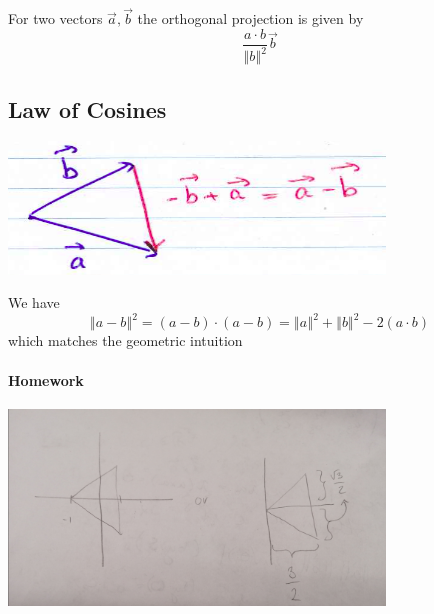 \documentclass[11pt]{book}
\begin{document}
\begin{defn}\label{defn:orthogonal_projection}
    For two vectors $\vec{a} , \vec{b} $ the orthogonal projection is given by
    \[
    \frac{a \cdot b}{\left\Vert b \right\Vert ^2 }\vec{b} 
    \]
\end{defn}

\subsection{Law of Cosines}%
\label{sub:law_of_cosines}

\begin{center}
    \includegraphics[width=100mm]{assets/lec1_loc.png} 
\end{center}

We have
\[
    \left\Vert a - b \right\Vert ^2 = \left( a - b \right)  \cdot \left( a - b \right) = \left\Vert a \right\Vert ^2  + \left\Vert b \right\Vert ^2  - 2\left( a  \cdot b \right) 
\]
which matches the geometric intuition 

\paragraph{Homework} 

\begin{center}
    \includegraphics[width=100mm]{assets/lec1_hw.jpg} 
\end{center}
\end{document}
